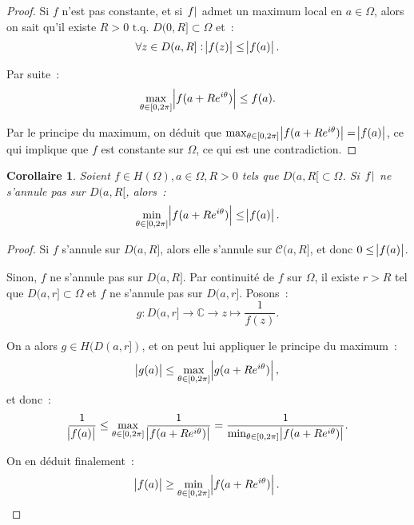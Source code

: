 \documentclass{report}
\newtheorem{cor}[thm]{Corollaire}
\theoremstyle{definition}
\theoremstyle{remark}
\numberwithin{equation}{section}
\newcommand{\C}{\mathbb C}
\newcommand{\tq}{\text{ t.q. }}
\begin{document}
			\begin{proof} Si $f$ n'est pas constante, et si $\abs f$ admet un maximum local en $a \in \Omega$, alors on sait qu'il existe $R > 0 \tq D(0, R] \subset \Omega$ et~:
			\begin{equation}
				\forall z \in D(a, R] : \abs {f(z)} \leq \abs {f(a)}.
			\end{equation}

			Par suite~:
			\begin{equation}
				\max_{\theta \in [0, 2\pi]}\abs {f(a+Re^{i\theta})} \leq f(a).
			\end{equation}

			Par le principe du maximum, on déduit que $\max_{\theta \in [0, 2\pi]}\abs {f(a+Re^{i\theta})} = \abs {f(a)}$, ce qui implique que $f$ est constante sur $\Omega$,
			ce qui est une contradiction.
			\end{proof}

			\begin{cor} Soient $f \in H(\Omega), a \in \Omega, R > 0$ tels que $D(a, R[ \subset \Omega$. Si $\abs f$ ne s'annule pas sur $D(a, R[$, alors~:
			\begin{equation}
				\min_{\theta \in [0, 2\pi]}\abs {f(a+Re^{i\theta})} \leq \abs {f(a)}.
			\end{equation}
			\end{cor}

			\begin{proof} Si $f$ s'annule sur $D(a, R]$, alors elle s'annule sur $\mathcal C(a, R]$, et donc $0 \leq \abs {f(a)}$.

			Sinon, $f$ ne s'annule pas sur $D(a, R]$. Par continuité de $f$ sur $\Omega$, il existe $r > R$ tel que $D(a, r] \subset \Omega$ et $f$
			ne s'annule pas sur $D(a, r]$. Posons~:
			\begin{equation}
				g : D(a, r] \to \C \to z \mapsto \frac 1{f(z)}.
			\end{equation}

			On a alors $g \in H(D(a, r])$, et on peut lui appliquer le principe du maximum~:
			\begin{equation}
				\abs {g(a)} \leq \max_{\theta \in [0, 2\pi]}\abs {g(a+Re^{i\theta})},
			\end{equation}
			et donc~:
			\begin{equation}
				\frac 1{\abs {f(a)}} \leq \max_{\theta \in [0, 2\pi]} \frac 1{\abs {f(a+Re^{i\theta})}} = \frac 1{\min_{\theta \in [0, 2\pi]}\abs {f(a+Re^{i\theta})}}.
			\end{equation}

			On en déduit finalement~:
			\begin{equation}
				\abs {f(a)} \geq \min_{\theta \in [0, 2\pi]}\abs {f(a+Re^{i\theta})}.
			\end{equation}
			\end{proof}
\end{document}

